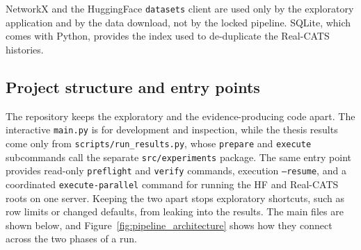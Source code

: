 \documentclass{thesisclass}
\begin{document}
NetworkX and the HuggingFace \texttt{datasets} client are used only by the
exploratory application and by the data download, not by the locked pipeline.
SQLite, which comes with Python, provides the index used to de-duplicate the
Real-CATS histories.

\subsection{Project structure and entry points}

The repository keeps the exploratory and the evidence-producing code apart. The
interactive \texttt{main.py} is for development and inspection, while the thesis
results come only from \texttt{scripts/run\_results.py}, whose \texttt{prepare} and
\texttt{execute} subcommands call the separate \texttt{src/experiments} package.
The same entry point provides read-only \texttt{preflight} and \texttt{verify}
commands, execution \texttt{--resume}, and a coordinated
\texttt{execute-parallel} command for running the HF and Real-CATS roots on one
server.
Keeping the two apart stops exploratory shortcuts, such as row limits or changed
defaults, from leaking into the results. The main files are shown below, and
Figure~\ref{fig:pipeline_architecture} shows how they connect across the two
phases of a run.
\end{document}

